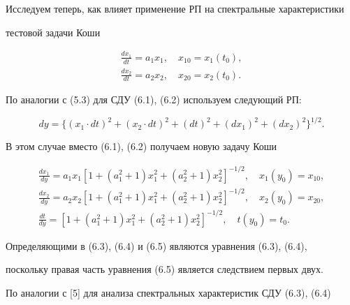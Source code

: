  


Исследуем теперь, как влияет применение РП на спектральные характеристики 


тестовой задачи Коши 


\begin{gather} 


\frac{dx_1}{dt}=a_1x_1,\quad x_{10}=x_1(t_0),\\ 


\frac{dx_2}{dt}=a_2x_2,\quad x_{20}=x_2(t_0). 


\end{gather} 


 


По аналогии с (5.3) для СДУ (6.1), (6.2) используем следующий РП: 


$$ 


dy=\{(x_1\cdot dt)^2+(x_2\cdot dt)^2+(dt)^2+ 


(dx_1)^2+(dx_2)^2\}^{1/2}. 


$$ 


В этом случае вместо (6.1), (6.2) получаем новую задачу Коши 


\begin{gather} 


\frac{dx_1}{dy}=a_1x_1[1+(a^2_1+1)x^2_1+(a^2_2+1)x^2_2]^{-1/2}, 


\quad x_1(y_0)=x_{10},\\ 


% 


\frac{dx_2}{dy}=a_2x_2[1+(a^2_1+1)x^2_1+(a^2_2+1)x^2_2]^{-1/2},\quad 


x_2(y_0)=x_{20},\\ 


% 


\frac{dt}{dy}=[1+(a^2_1+1)x^2_1+(a^2_2+1)x^2_2]^{-1/2},\quad 


t(y_0)=t_0.


\end{gather} 


 


 


Определяющими в (6.3), (6.4) и (6.5) являются уравнения (6.3), (6.4), 


поскольку правая часть уравнения (6.5) является следствием первых двух. 


 


По аналогии с [5] для анализа спектральных характеристик СДУ (6.3), (6.4) 



